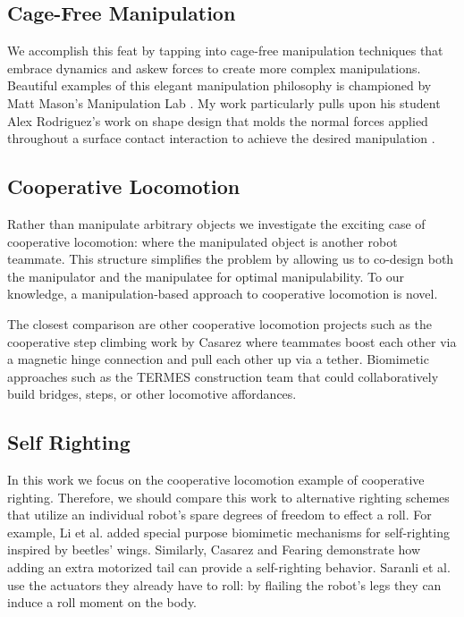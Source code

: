 \documentclass[letterpaper]{report}
\begin{document}
\subsection{Cage-Free Manipulation}
We accomplish this feat by tapping into cage-free manipulation techniques that embrace dynamics and askew forces to create more complex manipulations.
Beautiful examples of this elegant manipulation philosophy is championed by Matt Mason's Manipulation Lab \cite{lynch1999dynamic}\cite{dafle2014extrinsic}.
My work particularly pulls upon his student Alex Rodriguez's work on shape design that molds the normal forces applied throughout a surface contact interaction to achieve the desired manipulation \cite{rodriguez2013effector}.

\subsection{Cooperative Locomotion}
Rather than manipulate arbitrary objects we investigate the exciting case of cooperative locomotion: where the manipulated object is another robot teammate.
This structure simplifies the problem by allowing us to co-design both the manipulator and the manipulatee for optimal manipulability.
To our knowledge, a manipulation-based approach to cooperative locomotion is novel.

The closest comparison are other cooperative locomotion projects such as the cooperative step climbing work by Casarez \cite{casarez2016step} where teammates boost each other via a magnetic hinge connection and pull each other up via a tether.
Biomimetic approaches such as the TERMES \cite{werfel2014designing} construction team that could collaboratively build bridges, steps, or other locomotive affordances.

\subsection{Self Righting}
In this work we focus on the cooperative locomotion example of cooperative righting.
Therefore, we should compare this work to alternative righting schemes that utilize an individual robot's spare degrees of freedom to effect a roll.
For example, Li et al. \cite{li2016cockroach} added special purpose biomimetic mechanisms for self-righting inspired by beetles' wings.
Similarly, Casarez and Fearing \cite{casarezTailRighting} demonstrate how adding an extra motorized tail can provide a self-righting behavior.
Saranli et al. \cite{saranli2004model} use the actuators they already have to roll: by flailing the robot's legs they can induce a roll moment on the body.
\end{document}
